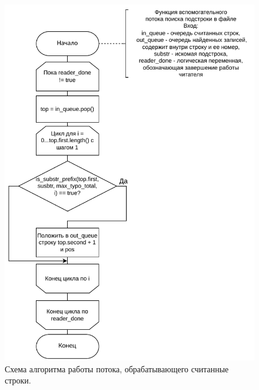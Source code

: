 \begin{figure}[h]
	\centering
	\includegraphics[height=0.8\textheight]{img/thread_substr.pdf}
	\caption{Схема алгоритма работы потока, обрабатывающего считанные строки.}
	\label{fig:parser}
\end{figure}

\clearpage

